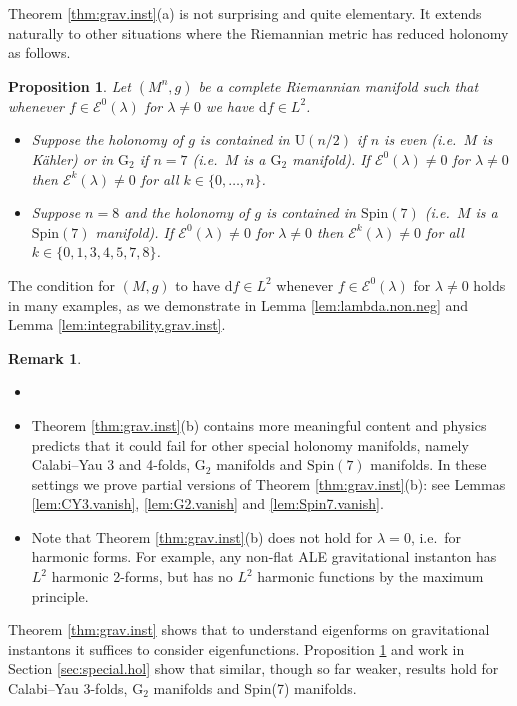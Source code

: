 \documentclass{article}
\newtheorem{prop}[thm]{Proposition}
\theoremstyle{definition}
\newtheorem{rmk}[thm]{Remark}
\numberwithin{thm}{section}
\numberwithin{equation}{section}
\def\d{\mathrm{d}}
\begin{document}
Theorem \ref{thm:grav.inst}(a) is not surprising and quite elementary. It extends naturally to other situations where the Riemannian metric has reduced holonomy as follows.


\begin{prop}\label{prop:function.forms.intro}
Let $(M^n,g)$ be a complete Riemannian manifold such that whenever $f\in\mathcal{E}^0(\lambda)$ for $\lambda\neq 0$ we have $\d f\in L^2$.
\begin{itemize}
\item[(a)] Suppose the holonomy of $g$ is contained in $\mathrm{U}(n/2)$ if $n$ is even (i.e.~$M$ is K\"ahler) or in $\mathrm{G}_2$ if $n=7$ (i.e.~$M$ is a $\mathrm{G}_2$ manifold).  If $\mathcal{E}^0(\lambda)\neq 0$ for $\lambda\neq 0$ then $\mathcal{E}^k(\lambda)\neq 0$ for all $k\in\{0,\ldots,n\}$.  
\item[(b)] Suppose $n=8$ and the holonomy of $g$ is contained in $\mathrm{Spin}(7)$ (i.e.~$M$ is a $\mathrm{Spin}(7)$ manifold).  If $\mathcal{E}^0(\lambda)\neq 0$ for $\lambda\neq 0$ then $\mathcal{E}^k(\lambda)\neq 0$ for all $k\in\{0,1,3,4,5,7,8\}$.
\end{itemize}
\end{prop}

\noindent The condition for $(M,g)$ to have $\d f\in L^2$ whenever $f\in\mathcal{E}^0(\lambda)$ for $\lambda\neq 0$ holds in many examples, as we demonstrate in Lemma \ref{lem:lambda.non.neg} and Lemma \ref{lem:integrability.grav.inst}.

\begin{rmk}
\begin{itemize}\item[]
\item Theorem \ref{thm:grav.inst}(b) contains more meaningful content and  physics predicts that it could fail for other special holonomy manifolds, namely Calabi--Yau 3 and 4-folds, $\mathrm{G}_2$ manifolds and $\mathrm{Spin}(7)$ manifolds.  In these settings we prove partial versions of Theorem \ref{thm:grav.inst}(b): see Lemmas \ref{lem:CY3.vanish}, \ref{lem:G2.vanish} and \ref{lem:Spin7.vanish}.     
\item Note that Theorem \ref{thm:grav.inst}(b) does not hold for $\lambda=0$, i.e.~for harmonic forms.  For example, any non-flat ALE gravitational instanton has $L^2$ harmonic 2-forms, but has no $L^2$ harmonic functions by the maximum principle.
\end{itemize}
\end{rmk}


Theorem \ref{thm:grav.inst} shows that to understand eigenforms on gravitational instantons it suffices to consider eigenfunctions. Proposition \ref{prop:function.forms.intro} and work in Section \ref{sec:special.hol} show that similar, though so far weaker, results  hold for Calabi--Yau 3-folds, $\mathrm{G}_2$ manifolds and Spin(7) manifolds.  
\end{document}
